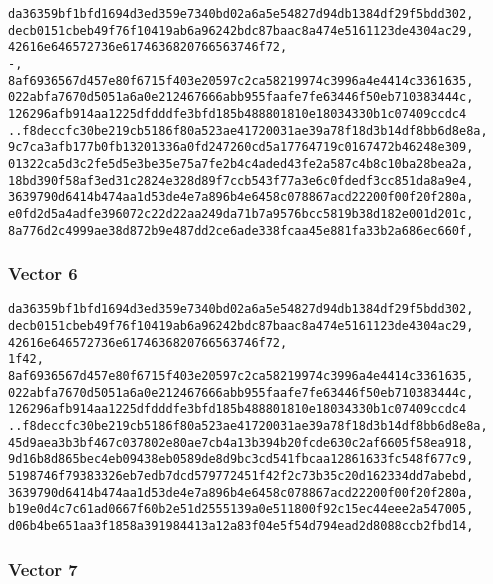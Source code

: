 \documentclass[
]{article}
\begin{document}
\begin{verbatim}
da36359bf1bfd1694d3ed359e7340bd02a6a5e54827d94db1384df29f5bdd302,
decb0151cbeb49f76f10419ab6a96242bdc87baac8a474e5161123de4304ac29,
42616e646572736e6174636820766563746f72,
-,
8af6936567d457e80f6715f403e20597c2ca58219974c3996a4e4414c3361635,
022abfa7670d5051a6a0e212467666abb955faafe7fe63446f50eb710383444c,
126296afb914aa1225dfdddfe3bfd185b488801810e18034330b1c07409ccdc4
..f8deccfc30be219cb5186f80a523ae41720031ae39a78f18d3b14df8bb6d8e8a,
9c7ca3afb177b0fb13201336a0fd247260cd5a17764719c0167472b46248e309,
01322ca5d3c2fe5d5e3be35e75a7fe2b4c4aded43fe2a587c4b8c10ba28bea2a,
18bd390f58af3ed31c2824e328d89f7ccb543f77a3e6c0fdedf3cc851da8a9e4,
3639790d6414b474aa1d53de4e7a896b4e6458c078867acd22200f00f20f280a,
e0fd2d5a4adfe396072c22d22aa249da71b7a9576bcc5819b38d182e001d201c,
8a776d2c4999ae38d872b9e487dd2ce6ade338fcaa45e881fa33b2a686ec660f,
\end{verbatim}

\hypertarget{vector-6-1}{%
\subsubsection{Vector 6}\label{vector-6-1}}

\begin{verbatim}
da36359bf1bfd1694d3ed359e7340bd02a6a5e54827d94db1384df29f5bdd302,
decb0151cbeb49f76f10419ab6a96242bdc87baac8a474e5161123de4304ac29,
42616e646572736e6174636820766563746f72,
1f42,
8af6936567d457e80f6715f403e20597c2ca58219974c3996a4e4414c3361635,
022abfa7670d5051a6a0e212467666abb955faafe7fe63446f50eb710383444c,
126296afb914aa1225dfdddfe3bfd185b488801810e18034330b1c07409ccdc4
..f8deccfc30be219cb5186f80a523ae41720031ae39a78f18d3b14df8bb6d8e8a,
45d9aea3b3bf467c037802e80ae7cb4a13b394b20fcde630c2af6605f58ea918,
9d16b8d865bec4eb09438eb0589de8d9bc3cd541fbcaa12861633fc548f677c9,
5198746f79383326eb7edb7dcd579772451f42f2c73b35c20d162334dd7abebd,
3639790d6414b474aa1d53de4e7a896b4e6458c078867acd22200f00f20f280a,
b19e0d4c7c61ad0667f60b2e51d2555139a0e511800f92c15ec44eee2a547005,
d06b4be651aa3f1858a391984413a12a83f04e5f54d794ead2d8088ccb2fbd14,
\end{verbatim}

\hypertarget{vector-7-1}{%
\subsubsection{Vector 7}\label{vector-7-1}}
\end{document}
